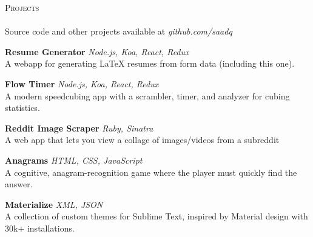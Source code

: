 \documentclass{article}
\newcommand{\lineunder} {
    \vspace*{-8pt} \\
    \hspace*{-18pt} \hrulefill \\
}
\newcommand{\header} [1] {
    {\hspace*{-18pt}\vspace*{6pt} \textsc{#1}}
    \vspace*{-6pt} \lineunder
}
\begin{document}

    \header{Projects}
    Source code and other projects available at \sl github.com/saadq \\

    \vspace{2mm}

    {\textbf{Resume Generator} \sl Node.js, Koa, React, Redux} \\
    A webapp for generating LaTeX resumes from form data (including this one). \\

    \vspace{2mm}

    {\textbf{Flow Timer} \sl Node.js, Koa, React, Redux}  \hfill \\

    A modern speedcubing app with a scrambler, timer, and analyzer for cubing statistics. \\

    \vspace{2mm}

    {\textbf{Reddit Image Scraper} \sl Ruby, Sinatra} \hfill \\

    A web app that lets you view a collage of images/videos from a subreddit

    \vspace{2mm}

    {\textbf{Anagrams} \sl HTML, CSS, JavaScript}  \hfill \\

    A cognitive, anagram-recognition game where the player must quickly find the answer. \\

    \vspace{2mm}

    {\textbf{Materialize} \sl XML, JSON} \hfill \\

    A collection of custom themes for Sublime Text, inspired by Material design with 30k+ installations.
\end{document}
